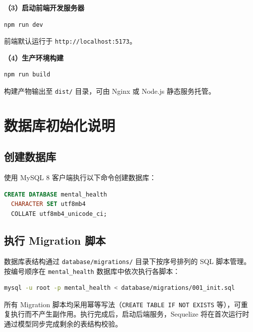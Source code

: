 \textbf{（3）启动前端开发服务器}

\begin{lstlisting}[language=bash, caption={启动前端开发服务器}]
npm run dev
\end{lstlisting}

前端默认运行于 \texttt{http://localhost:5173}。

\textbf{（4）生产环境构建}

\begin{lstlisting}[language=bash, caption={生产构建}]
npm run build
\end{lstlisting}

构建产物输出至 \texttt{dist/} 目录，可由 Nginx 或 Node.js 静态服务托管。


\section{数据库初始化说明}

\subsection{创建数据库}

使用 MySQL 8 客户端执行以下命令创建数据库：

\begin{lstlisting}[language=SQL, caption={创建数据库}]
CREATE DATABASE mental_health
  CHARACTER SET utf8mb4
  COLLATE utf8mb4_unicode_ci;
\end{lstlisting}

\subsection{执行 Migration 脚本}

数据库表结构通过 \texttt{database/migrations/} 目录下按序号排列的 SQL 脚本管理。按编号顺序在 \texttt{mental\_health} 数据库中依次执行各脚本：

\begin{lstlisting}[language=bash, caption={执行 Migration 脚本}]
mysql -u root -p mental_health < database/migrations/001_init.sql
\end{lstlisting}

所有 Migration 脚本均采用幂等写法（\texttt{CREATE TABLE IF NOT EXISTS} 等），可重复执行而不产生副作用。执行完成后，启动后端服务，Sequelize 将在首次运行时通过模型同步完成剩余的表结构校验。

